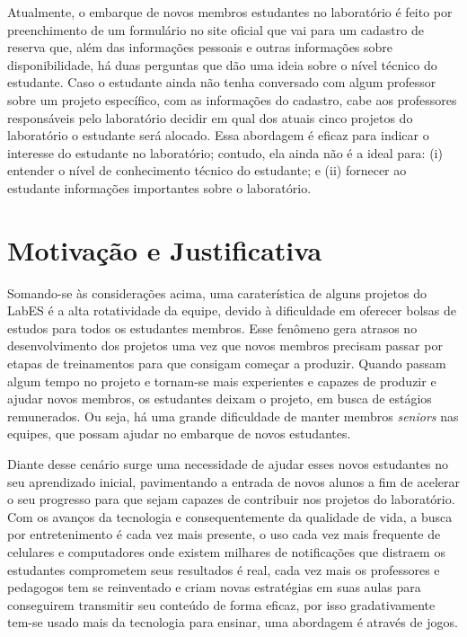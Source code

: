 Atualmente, o embarque de novos membros estudantes no laboratório é feito por preenchimento de um formulário no site oficial que vai para um cadastro de reserva que, além das informações pessoais e outras informações sobre disponibilidade, há duas perguntas que dão uma ideia sobre o nível técnico do estudante. Caso o estudante ainda não tenha conversado com algum professor sobre um projeto específico, com as informações do cadastro, cabe aos professores responsáveis pelo laboratório decidir em qual dos atuais cinco projetos do laboratório o estudante será alocado. Essa abordagem é eficaz para indicar o interesse do estudante no laboratório; contudo, ela ainda não é a ideal para: (i) entender o nível de conhecimento técnico do estudante; e (ii) fornecer ao estudante informações importantes sobre o laboratório.


\section{Motivação e Justificativa}
\label{sec-intro-motjus}
Somando-se às considerações acima, uma caraterística de alguns projetos do LabES é a alta rotatividade da equipe, devido à dificuldade em oferecer bolsas de estudos para todos os estudantes membros. Esse fenômeno gera atrasos no desenvolvimento dos projetos uma vez que novos membros precisam passar por etapas de treinamentos para que consigam começar a produzir. Quando passam algum tempo no projeto e tornam-se mais experientes e capazes de produzir e ajudar novos membros, os estudantes deixam o projeto, em busca de estágios remunerados. Ou seja, há uma grande dificuldade de manter membros \textit{seniors} nas equipes, que possam ajudar no embarque de novos estudantes. 

Diante desse cenário surge uma necessidade de ajudar esses novos estudantes no seu aprendizado inicial, pavimentando a entrada de novos alunos a fim de acelerar o seu progresso para que sejam capazes de contribuir nos projetos do laboratório.
Com os avanços da tecnologia e consequentemente da qualidade de vida, a busca por entretenimento é cada vez mais presente, o uso cada vez mais frequente de celulares e computadores onde existem milhares de notificações que distraem os estudantes comprometem seus resultados é real, cada vez mais os professores e pedagogos tem se reinventado e criam novas estratégias em suas aulas para conseguirem transmitir seu conteúdo de forma eficaz, por isso gradativamente tem-se usado mais da tecnologia para ensinar, uma abordagem é através de jogos. 

